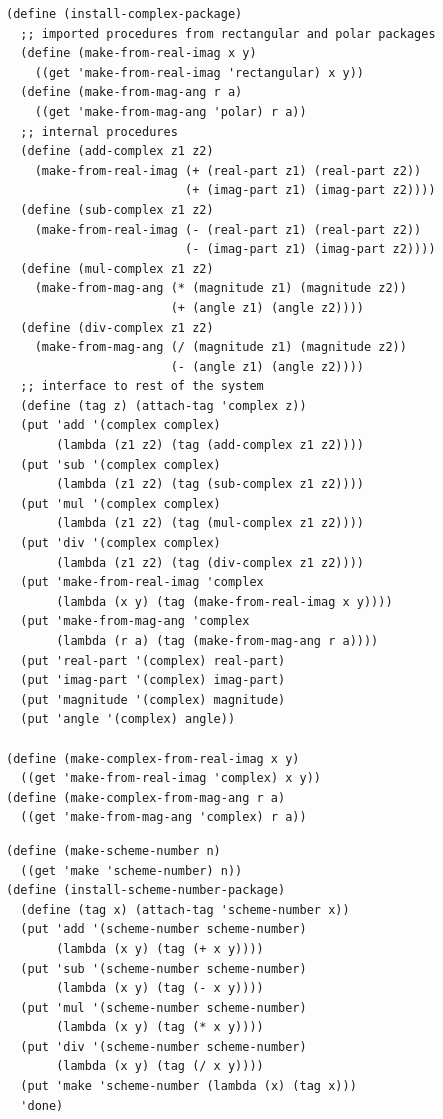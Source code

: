 \documentclass[final,fleqn,titlepage,twoside]{article}
\begin{document}
\begin{verbatim}
(define (install-complex-package)
  ;; imported procedures from rectangular and polar packages
  (define (make-from-real-imag x y)
    ((get 'make-from-real-imag 'rectangular) x y))
  (define (make-from-mag-ang r a)
    ((get 'make-from-mag-ang 'polar) r a))
  ;; internal procedures
  (define (add-complex z1 z2)
    (make-from-real-imag (+ (real-part z1) (real-part z2))
                         (+ (imag-part z1) (imag-part z2))))
  (define (sub-complex z1 z2)
    (make-from-real-imag (- (real-part z1) (real-part z2))
                         (- (imag-part z1) (imag-part z2))))
  (define (mul-complex z1 z2)
    (make-from-mag-ang (* (magnitude z1) (magnitude z2))
                       (+ (angle z1) (angle z2))))
  (define (div-complex z1 z2)
    (make-from-mag-ang (/ (magnitude z1) (magnitude z2))
                       (- (angle z1) (angle z2))))
  ;; interface to rest of the system
  (define (tag z) (attach-tag 'complex z))
  (put 'add '(complex complex)
       (lambda (z1 z2) (tag (add-complex z1 z2))))
  (put 'sub '(complex complex)
       (lambda (z1 z2) (tag (sub-complex z1 z2))))
  (put 'mul '(complex complex)
       (lambda (z1 z2) (tag (mul-complex z1 z2))))
  (put 'div '(complex complex)
       (lambda (z1 z2) (tag (div-complex z1 z2))))
  (put 'make-from-real-imag 'complex
       (lambda (x y) (tag (make-from-real-imag x y))))
  (put 'make-from-mag-ang 'complex
       (lambda (r a) (tag (make-from-mag-ang r a))))
  (put 'real-part '(complex) real-part)
  (put 'imag-part '(complex) imag-part)
  (put 'magnitude '(complex) magnitude)
  (put 'angle '(complex) angle))

(define (make-complex-from-real-imag x y)
  ((get 'make-from-real-imag 'complex) x y))
(define (make-complex-from-mag-ang r a)
  ((get 'make-from-mag-ang 'complex) r a))
\end{verbatim}
\begin{verbatim}
(define (make-scheme-number n)
  ((get 'make 'scheme-number) n))
(define (install-scheme-number-package)
  (define (tag x) (attach-tag 'scheme-number x))
  (put 'add '(scheme-number scheme-number)
       (lambda (x y) (tag (+ x y))))
  (put 'sub '(scheme-number scheme-number)
       (lambda (x y) (tag (- x y))))
  (put 'mul '(scheme-number scheme-number)
       (lambda (x y) (tag (* x y))))
  (put 'div '(scheme-number scheme-number)
       (lambda (x y) (tag (/ x y))))
  (put 'make 'scheme-number (lambda (x) (tag x)))
  'done)
\end{verbatim}
\end{document}
